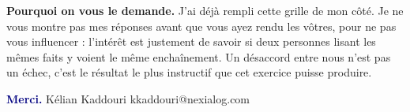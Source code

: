 \documentclass[11pt,a4paper]{article}
\begin{document}
\vspace{4mm}
\begin{cle}
\textbf{Pourquoi on vous le demande.} J'ai déjà rempli cette grille de mon côté. Je ne vous
montre pas mes réponses avant que vous ayez rendu les vôtres, pour ne pas vous influencer :
l'intérêt est justement de savoir si deux personnes lisant les mêmes faits y voient le même
enchaînement. Un désaccord entre nous n'est pas un échec, c'est le résultat le plus instructif
que cet exercice puisse produire.
\end{cle}

\vspace{-1pt}
{\footnotesize\textcolor{navy}{\textbf{Merci.}} Kélian Kaddouri \textbullet{}
kkaddouri@nexialog.com}
\end{document}
